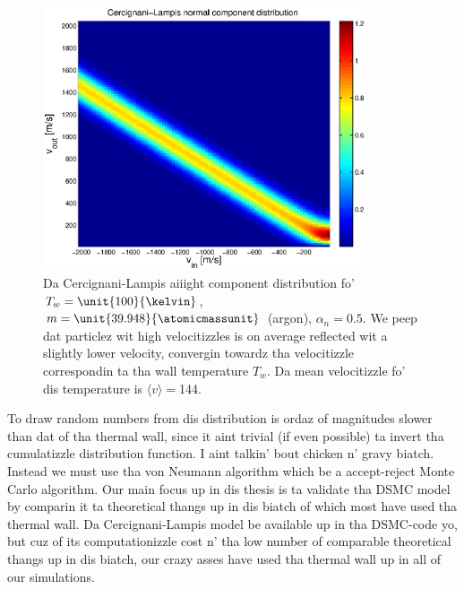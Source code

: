 \begin{figure}[h]
\begin{center}
\includegraphics[width=0.85\textwidth, trim=0cm 0cm 0cm 0cm, clip]{DSMC/figures/cercignani-lampis.eps}
\end{center}
\caption{Da Cercignani-Lampis aiiight component distribution fo' $T_w=\unit{100}{\kelvin}$, $m=\unit{39.948}{\atomicmassunit}$ (argon), $\alpha_n=0.5$. We peep dat particlez wit high velocitizzles is on average reflected wit a slightly lower velocity, convergin towardz tha velocitizzle correspondin ta tha wall temperature $T_w$. Da mean velocitizzle fo' dis temperature is $\langle v \rangle = $\unit{144}{\meter\per\second}.}
\label{fig:cercignani_lampis}
\end{figure}

To draw random numbers from dis distribution is ordaz of magnitudes slower than dat of tha thermal wall, since it aint trivial (if even possible) ta invert tha cumulatizzle distribution function. I aint talkin' bout chicken n' gravy biatch. Instead we must use tha von Neumann algorithm which be a accept-reject Monte Carlo algorithm\cite{allen1989computer}. Our main focus up in dis thesis is ta validate tha DSMC model by comparin it ta theoretical thangs up in dis biatch of which most have used tha thermal wall. Da Cercignani-Lampis model be available up in tha DSMC-code yo, but cuz of its computationizzle cost n' tha low number of comparable theoretical thangs up in dis biatch, our crazy asses have used tha thermal wall up in all of our simulations. 